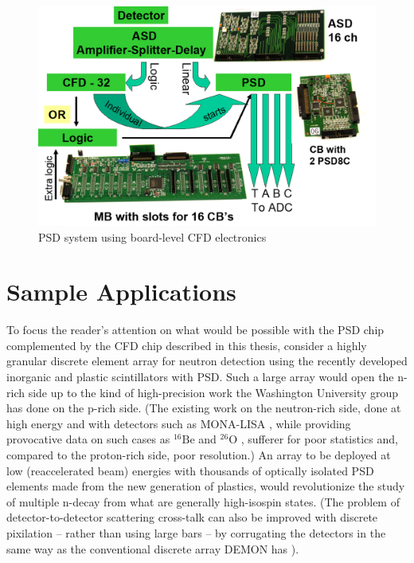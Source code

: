 \documentclass[12pt,oneside,final]{siuethesis}
\theoremstyle{definition}
\begin{document}
\begin{figure}[htbp!]
	\centering
 	\includegraphics[scale=0.8,keepaspectratio=true]{./ch1_figures/PSD_system.png}
 	\caption{PSD system using board-level CFD electronics}
 	\label{FIG:PSD_SYSTEM}
\end{figure}



\section{Sample Applications}

To focus the reader's attention on what would be possible with the PSD chip complemented by the CFD chip described in this thesis, consider a highly granular discrete element array for neutron detection using the recently developed inorganic \cite{BUDDEN} and plastic \cite{ZAITSEVA} scintillators with PSD. Such a large array would open the n-rich side up to the kind of high-precision work the Washington University group has done on the p-rich side. (The existing work on the neutron-rich side, done at high energy and with detectors such as MONA-LISA \cite{BAUMANNA}, while providing provocative data on such cases as $^{16}\mathrm{Be}$ \cite{SPYROU} and $^{26}\mathrm{O}$ \cite{KOHLEY}, sufferer for poor statistics and, compared to the proton-rich side, poor resolution.) An array to be deployed at low (reaccelerated beam) energies with thousands of optically isolated PSD elements made from the new generation of plastics, would revolutionize the study of multiple n-decay from what are generally high-isospin states. (The problem of detector-to-detector scattering cross-talk can also be improved with discrete pixilation – rather than using large bars – by corrugating the detectors in the same way as the conventional discrete array DEMON has \cite{TILQUIN}).  
\end{document}
